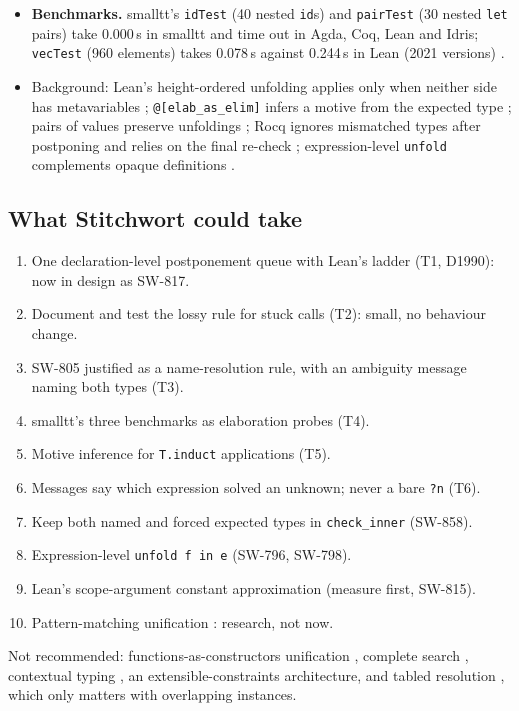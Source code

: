 \documentclass[11pt,a4paper]{article}
\newcommand{\code}[1]{\texttt{#1}}
\begin{document}
\begin{itemize}
    \cite{zhao2024marking}.
  \item \textbf{Benchmarks.} smalltt's \code{idTest} (40 nested \code{id}s) and \code{pairTest}
    (30 nested \code{let} pairs) take 0.000\,s in smalltt and time out in Agda, Coq, Lean and
    Idris; \code{vecTest} (960 elements) takes 0.078\,s against 0.244\,s in Lean (2021
    versions) \cite{kovacs2021smalltt}.
  \item Background: Lean's height-ordered unfolding applies only when neither side has
    metavariables \cite{lean2026defeq}; \code{@[elab\_as\_elim]} infers a motive from the
    expected type \cite{lean2026elabsrc}; pairs of values preserve unfoldings
    \cite{kovacs2024wits}; Rocq ignores mismatched types after postponing and relies on the
    final re-check \cite{kovacs2026wits}; expression-level \code{unfold} complements opaque
    definitions \cite{gratzer2025unfolding}.
\end{itemize}

\subsection{What Stitchwort could take}
\begin{enumerate}
  \item One declaration-level postponement queue with Lean's ladder (T1, D1990): now in
        design as SW-817.
  \item Document and test the lossy rule for stuck calls (T2): small, no behaviour change.
  \item SW-805 justified as a name-resolution rule, with an ambiguity message naming both
        types (T3).
  \item smalltt's three benchmarks as elaboration probes (T4).
  \item Motive inference for \code{T.induct} applications (T5).
  \item Messages say which expression solved an unknown; never a bare \code{?n} (T6).
  \item Keep both named and forced expected types in \code{check\_inner} (SW-858).
  \item Expression-level \code{unfold f in e} (SW-796, SW-798).
  \item Lean's scope-argument constant approximation (measure first, SW-815).
  \item Pattern-matching unification \cite{richter2026pmu}: research, not now.
\end{enumerate}
Not recommended: functions-as-constructors unification \cite{libal2021fcu}, complete search
\cite{norman2026canonical}, contextual typing \cite{xue2024contextual}, an
extensible-constraints architecture, and tabled resolution \cite{selsam2020tabled}, which only
matters with overlapping instances.
\end{document}
